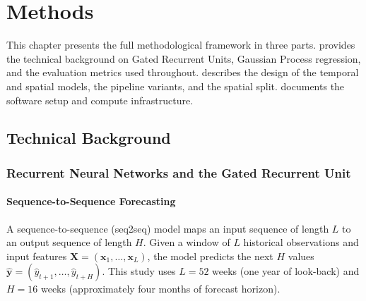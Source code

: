 
\chapter{Methods}
\label{ch:methods}

This chapter presents the full methodological framework in three parts.
 provides the technical background on Gated Recurrent Units, Gaussian
Process regression, and the evaluation metrics used throughout.
 describes the design of the temporal and spatial models, the pipeline variants, and the spatial split.
 documents the software setup and compute infrastructure.

\section{Technical Background}
\label{sec:background}

\subsection{Recurrent Neural Networks and the Gated Recurrent Unit}
\label{subsec:rnn_gru}

\subsubsection{Sequence-to-Sequence Forecasting}

A sequence-to-sequence (seq2seq) model maps an input sequence of length $L$ to an output
sequence of length $H$. Given a window of $L$ historical observations and input features
$\mathbf{X} = (\mathbf{x}_1, \ldots, \mathbf{x}_L)$, the model predicts the next $H$ values
$\hat{\mathbf{y}} = (\hat{y}_{t+1}, \ldots, \hat{y}_{t+H})$. This study uses $L = 52$ weeks (one year of look-back) and $H = 16$ weeks (approximately four months of forecast horizon).

